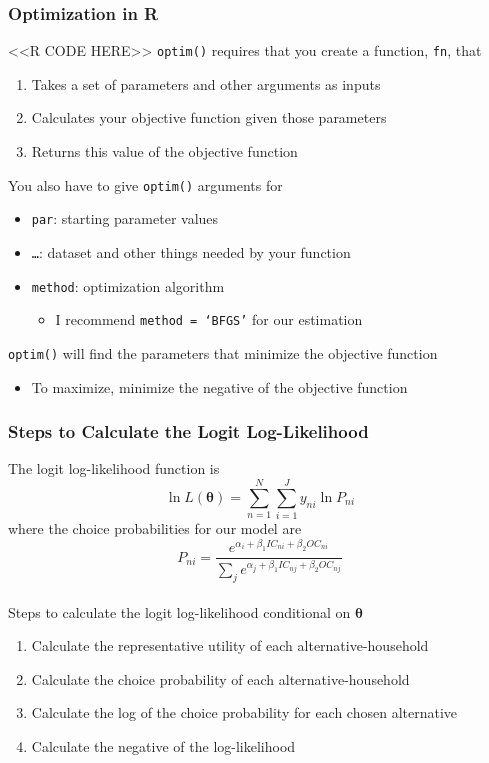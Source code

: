 \documentclass{beamer}
\begin{document}
\begin{frame}[fragile]\frametitle{Optimization in R}
    <<R CODE HERE>>
    \vspace{1ex}
    \texttt{optim()} requires that you create a function, \texttt{fn}, that
    \begin{enumerate}
        \item Takes a set of parameters and other arguments as inputs
        \item Calculates your objective function given those parameters
        \item Returns this value of the objective function
    \end{enumerate}
    \vspace{1ex}
    You also have to give \texttt{optim()} arguments for
    \begin{itemize}
        \item \texttt{par}: starting parameter values
        \item \texttt{\ldots}: dataset and other things needed by your function
        \item \texttt{method}: optimization algorithm
        \begin{itemize}
            \item I recommend \texttt{method = `BFGS'} for our estimation
        \end{itemize}
    \end{itemize}
    \vspace{1ex}
    \texttt{optim()} will find the parameters that minimize the objective function
    \begin{itemize}
        \item To maximize, minimize the negative of the objective function
    \end{itemize}
\end{frame}

\begin{frame}\frametitle{Steps to Calculate the Logit Log-Likelihood}
    The logit log-likelihood function is
    $$\ln L(\bm{\theta}) = \sum_{n = 1}^N \sum_{i = 1}^J y_{ni} \ln P_{ni}$$
    where the choice probabilities for our model are
    $$P_{ni} = \frac{e^{\alpha_i + \beta_1 IC_{ni} + \beta_2 OC_{ni}}}{\sum_j e^{\alpha_j + \beta_1 IC_{nj} + \beta_2 OC_{nj}}}$$ \\
    \vspace{2ex}
    Steps to calculate the logit log-likelihood conditional on $\bm{\theta}$
    \begin{enumerate}
        \item Calculate the representative utility of each alternative-household
        \item Calculate the choice probability of each alternative-household
        \item Calculate the log of the choice probability for each chosen alternative
        \item Calculate the negative of the log-likelihood
    \end{enumerate}
\end{frame}
\end{document}
